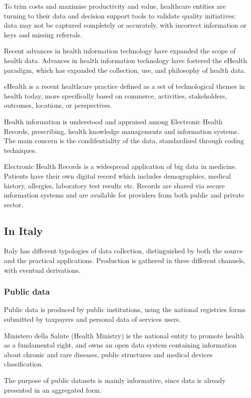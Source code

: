 To trim costs and maximise productivity and value, healthcare entities are turning to their data and decision support tools to validate quality initiatives: data may not be captured completely or accurately, with incorrect information or keys and missing referrals.

Recent advances in health information technology have expanded the scope of health data. Advances in health information technology have fostered the eHealth paradigm, which has expanded the collection, use, and philosophy of health data.

eHealth is a recent healthcare practice defined as a set of technological themes in health today, more specifically based on commerce, activities, stakeholders, outcomes, locations, or perspectives\cite{ehealth}.

Health information is understood and appraised among Electronic Health Records, prescribing, health knowledge managements and information systems. The main concern is the condifentiality of the data, standardised through coding techniques.

Electronic Health Records is a widespread application of big data in medicine. Patients have their own digital record which includes demographics, medical history, allergies, laboratory test results etc. Records are shared via secure information systems and are available for providers from both public and private sector\cite{datapine}.

\subsection{In Italy}
Italy has different typologies of data collection, distinguished by both the source and the practical applications. Production is gathered in three different channels, with eventual derivations.

\subsubsection{Public data}
Public data is produced by public institutions, using the national registries forms submitted by taxpayers and personal data of services users.

Ministero della Salute (Health Ministry) is the national entity to promote health as a fundamental right, and owns an open data system containing information about chronic and rare diseases, public structures and medical devices classification. 

The purpose of public datasets is mainly informative, since data is already presented in an aggregated form.

